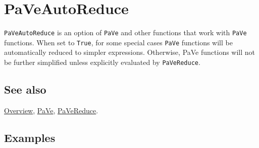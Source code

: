 \documentclass[../FeynCalcManual.tex]{subfiles}
\begin{document}
\hypertarget{paveautoreduce}{%
\section{PaVeAutoReduce}\label{paveautoreduce}}

\texttt{PaVeAutoReduce} is an option of \texttt{PaVe} and other
functions that work with \texttt{PaVe} functions. When set to
\texttt{True}, for some special cases \texttt{PaVe} functions will be
automatically reduced to simpler expressions. Otherwise, PaVe functions
will not be further simplified unless explicitly evaluated by
\texttt{PaVeReduce}.

\subsection{See also}

\hyperlink{toc}{Overview}, \hyperlink{pave}{PaVe},
\hyperlink{pavereduce}{PaVeReduce}.

\subsection{Examples}
\end{document}
